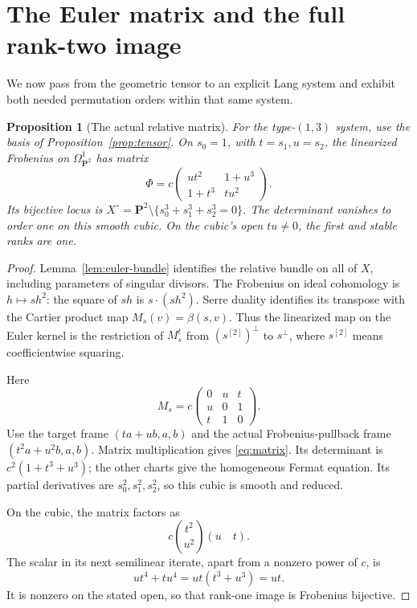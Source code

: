 \documentclass[11pt]{article}
\newtheorem{proposition}[theorem]{Proposition}
\theoremstyle{remark}\newtheorem{remark}[theorem]{Remark}
\newcommand{\PP}{\mathbf P}
\begin{document}
\section{The Euler matrix and the full rank-two image}\label{sec:three-proof}

We now pass from the geometric tensor to an explicit Lang system and exhibit both needed permutation orders within that same system.

\begin{proposition}[The actual relative matrix]\label{prop:matrix}
For the type-$(1,3)$ system, use the basis of Proposition~\ref{prop:tensor}. On $s_0=1$, with $t=s_1,u=s_2$, the linearized Frobenius on $\Omega^1_{\PP^2}$ has matrix
\begin{equation}\label{eq:matrix}
 \Phi=c\begin{pmatrix}ut^2&1+u^3\\1+t^3&tu^2\end{pmatrix}.
\end{equation}
Its bijective locus is $X^\circ=\PP^2\setminus\{s_0^3+s_1^3+s_2^3=0\}$. The determinant vanishes to order one on this smooth cubic. On the cubic's open $tu\ne0$, the first and stable ranks are one.
\end{proposition}
\begin{proof}
Lemma~\ref{lem:euler-bundle} identifies the relative bundle on all of $X$, including parameters of singular divisors. The Frobenius on ideal cohomology is $h\mapsto s h^2$: the square of $sh$ is $s\cdot(sh^2)$. Serre duality identifies its transpose with the Cartier product map $M_s(v)=\beta(s,v)$. Thus the linearized map on the Euler kernel is the restriction of $M_s^t$ from $(s^{[2]})^\perp$ to $s^\perp$, where $s^{[2]}$ means coefficientwise squaring.

Here
\[
 M_s=c\begin{pmatrix}0&u&t\\u&0&1\\t&1&0\end{pmatrix}.
\]
Use the target frame $(ta+ub,a,b)$ and the actual Frobenius-pullback frame $(t^2a+u^2b,a,b)$. Matrix multiplication gives \eqref{eq:matrix}. Its determinant is $c^2(1+t^3+u^3)$; the other charts give the homogeneous Fermat equation. Its partial derivatives are $s_0^2,s_1^2,s_2^2$, so this cubic is smooth and reduced.

On the cubic, the matrix factors as
\[
                  c\binom{t^2}{u^2}(u\quad t).
\]
The scalar in its next semilinear iterate, apart from a nonzero power of $c$, is
\[
                 ut^4+tu^4=ut(t^3+u^3)=ut.
\]
It is nonzero on the stated open, so that rank-one image is Frobenius bijective.
\end{proof}
\end{document}
